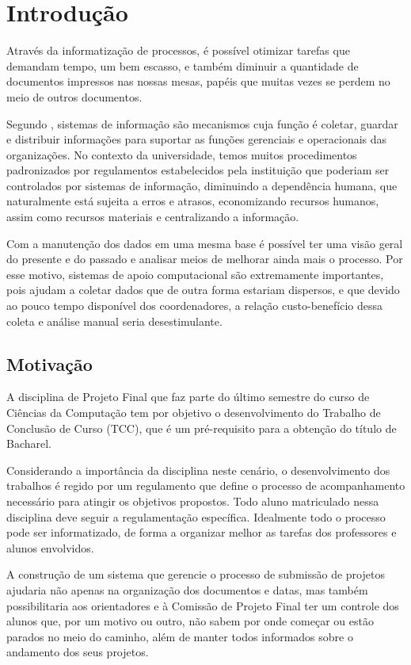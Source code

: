 \chapter{Introdução}
Através da informatização de processos, é possível otimizar tarefas que demandam tempo, 
um bem escasso, e também diminuir a quantidade de documentos impressos nas nossas mesas, 
papéis que muitas vezes se perdem no meio de outros documentos.

Segundo \cite{Freitas:1997}, sistemas de informação são mecanismos cuja função é coletar, guardar e 
distribuir informações para suportar as funções gerenciais e operacionais das organizações.
No contexto da universidade, temos muitos procedimentos padronizados por regulamentos estabelecidos
pela instituição que poderiam ser controlados por sistemas de informação, diminuindo a
dependência humana, que naturalmente está sujeita a erros e atrasos, economizando recursos humanos, 
assim como recursos materiais e centralizando a informação. 

Com a manutenção dos dados em uma mesma base é possível ter uma visão geral do presente 
e do passado e analisar meios de melhorar ainda mais o processo. Por esse motivo, sistemas de apoio
computacional são extremamente importantes, pois ajudam a coletar dados que de outra forma estariam
dispersos, e que devido ao pouco tempo disponível dos coordenadores, a relação custo-benefício dessa
coleta e análise manual seria desestimulante.

\section{Motivação}
A disciplina de Projeto Final que faz parte do último semestre do curso de Ciências da Computação
tem por objetivo o desenvolvimento do Trabalho de Conclusão de Curso (TCC), que é um pré-requisito para a obtenção do título de Bacharel.

Considerando a importância da disciplina neste cenário, o desenvolvimento dos trabalhos é regido por um
regulamento que define o processo de acompanhamento necessário para atingir os objetivos propostos.
Todo aluno matriculado nessa disciplina deve seguir a regulamentação específica. Idealmente todo o 
processo pode ser informatizado, de forma a organizar melhor as tarefas dos professores e alunos envolvidos.

A construção de um sistema que gerencie o processo de submissão de projetos ajudaria 
não apenas na organização dos documentos e datas, mas também possibilitaria aos 
orientadores e à Comissão de Projeto Final ter um controle dos alunos que, por um 
motivo ou outro, não sabem por onde começar ou estão parados no meio do caminho, 
além de manter todos informados sobre o andamento dos seus projetos.


